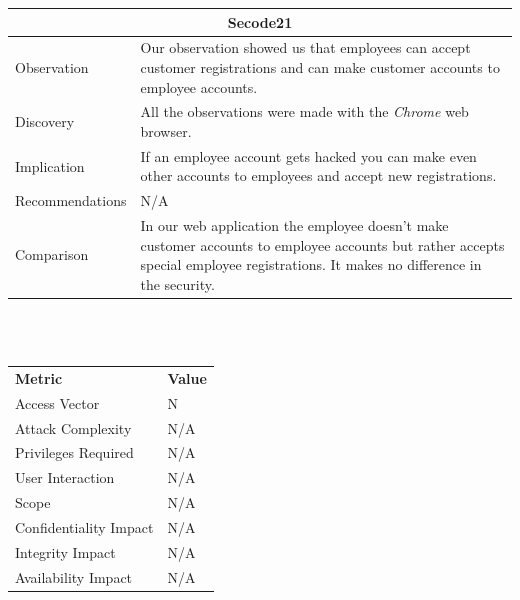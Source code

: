 \documentclass[headsepline,footsepline,footinclude=false,oneside,fontsize=11pt,paper=a4,listof=totoc,bibliography=totoc]{scrbook} %
\begin{document}
\begin{tabular}{ l|p{11cm}  }
	\hline
	\multicolumn{2}{c}{\textbf{Secode21}} \\ 
	\hline
	Observation   & Our observation showed us that employees can accept customer registrations and can make customer accounts to employee accounts. \\
	Discovery  & All the observations were made with the \textit{Chrome} web browser. \\
	Implication    & If an employee account gets hacked you can make even other accounts to employees and accept new registrations. \\
	Recommendations & N/A \\
	Comparison & In our web application the employee doesn't make customer accounts to employee accounts but rather accepts special employee registrations. It makes no difference in the security. \\  
	\hline
\end{tabular}
\\
\vspace{0.5cm}
\\
\begin{center}
	\begin{tabular}{ll}
		\rowcolor[HTML]{34CDF9} 
		{\color[HTML]{ECF4FF} \textbf{Metric}}        & {\color[HTML]{ECF4FF} \textbf{Value}} \\
		\rowcolor[HTML]{BBDAFF} 
		{\color[HTML]{333333} Access Vector}          & {\color[HTML]{333333} } N              \\
		\rowcolor[HTML]{ECF4FF} 
		{\color[HTML]{333333} Attack Complexity}      & {\color[HTML]{333333} } N/A              \\
		\rowcolor[HTML]{BBDAFF} 
		{\color[HTML]{333333} Privileges Required}    & {\color[HTML]{333333} } N/A              \\
		\rowcolor[HTML]{ECF4FF} 
		{\color[HTML]{333333} User Interaction}       & {\color[HTML]{333333} } N/A              \\
		\rowcolor[HTML]{BBDAFF} 
		{\color[HTML]{333333} Scope}                  & {\color[HTML]{333333} } N/A              \\
		\rowcolor[HTML]{ECF4FF} 
		{\color[HTML]{333333} Confidentiality Impact} & {\color[HTML]{333333} } N/A              \\
		\rowcolor[HTML]{BBDAFF} 
		{\color[HTML]{333333} Integrity Impact}       & {\color[HTML]{333333} } N/A              \\
		\rowcolor[HTML]{ECF4FF} 
		{\color[HTML]{333333} Availability Impact}    & {\color[HTML]{333333} } N/A             
	\end{tabular}
\end{center}
\pagebreak
\end{document}
